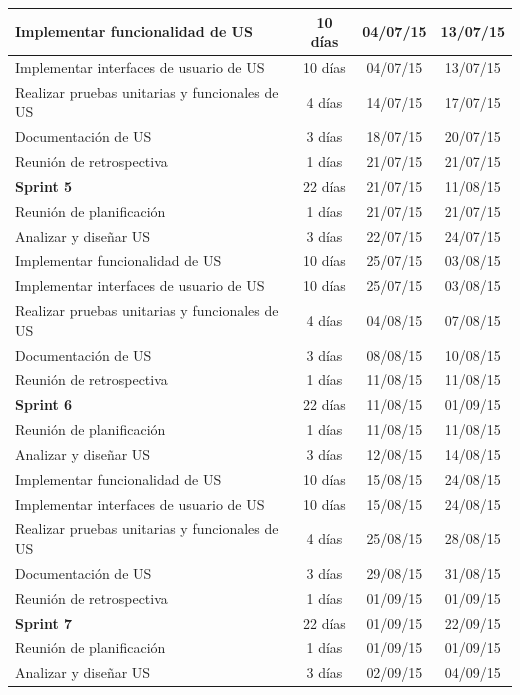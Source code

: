 {\begin{longtable}{|p{9cm}|c|c|c|}
  Implementar funcionalidad de US & 10 días & 04/07/15 & 13/07/15 \\ \hline
  Implementar interfaces de usuario de US & 10 días & 04/07/15 & 13/07/15 \\ \hline
  Realizar pruebas unitarias y funcionales de US & 4 días & 14/07/15 & 17/07/15 \\ \hline
  Documentación de US & 3 días & 18/07/15 & 20/07/15 \\ \hline
  Reunión de retrospectiva & 1 días & 21/07/15 & 21/07/15 \\ \hline
\textbf{Sprint 5} & 22 días & 21/07/15 & 11/08/15 \\ \hline
  Reunión de planificación & 1 días & 21/07/15 & 21/07/15 \\ \hline
  Analizar y diseñar US & 3 días & 22/07/15 & 24/07/15 \\ \hline
  Implementar funcionalidad de US & 10 días & 25/07/15 & 03/08/15 \\ \hline
  Implementar interfaces de usuario de US & 10 días & 25/07/15 & 03/08/15 \\ \hline
  Realizar pruebas unitarias y funcionales de US & 4 días & 04/08/15 & 07/08/15 \\ \hline
  Documentación de US & 3 días & 08/08/15 & 10/08/15 \\ \hline
  Reunión de retrospectiva & 1 días & 11/08/15 & 11/08/15 \\ \hline
\textbf{Sprint 6} & 22 días & 11/08/15 & 01/09/15 \\ \hline
  Reunión de planificación & 1 días & 11/08/15 & 11/08/15 \\ \hline
  Analizar y diseñar US & 3 días & 12/08/15 & 14/08/15 \\ \hline
  Implementar funcionalidad de US & 10 días & 15/08/15 & 24/08/15 \\ \hline
  Implementar interfaces de usuario de US & 10 días & 15/08/15 & 24/08/15 \\ \hline
  Realizar pruebas unitarias y funcionales de US & 4 días & 25/08/15 & 28/08/15 \\ \hline
  Documentación de US & 3 días & 29/08/15 & 31/08/15 \\ \hline
  Reunión de retrospectiva & 1 días & 01/09/15 & 01/09/15 \\ \hline
\textbf{Sprint 7} & 22 días & 01/09/15 & 22/09/15 \\ \hline
  Reunión de planificación & 1 días & 01/09/15 & 01/09/15 \\ \hline
  Analizar y diseñar US & 3 días & 02/09/15 & 04/09/15 \\ \hline

\end{longtable}}

